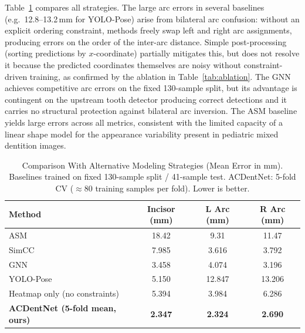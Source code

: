 \documentclass[conference]{IEEEtran}
\begin{document}
Table~\ref{tab:method_comparison} compares all strategies. The large arc errors in several
baselines (e.g.\ 12.8--13.2\,mm for YOLO-Pose) arise from bilateral arc confusion: without an
explicit ordering constraint, methods freely swap left and right arc assignments, producing
errors on the order of the inter-arc distance. Simple post-processing (sorting predictions by
$x$-coordinate) partially mitigates this, but does not resolve it because the predicted
coordinates themselves are noisy without constraint-driven training, as confirmed by the
ablation in Table~\ref{tab:ablation}. The GNN achieves competitive arc errors on the fixed
130-sample split, but its advantage is contingent on the upstream tooth detector producing
correct detections and it carries no structural protection against bilateral arc inversion. The
ASM baseline yields large errors across all metrics, consistent with the limited capacity of a
linear shape model for the appearance variability present in pediatric mixed dentition images.

\begin{table}[htbp]
\caption{Comparison With Alternative Modeling Strategies (Mean Error in mm). Baselines trained
on fixed 130-sample split / 41-sample test. ACDentNet: 5-fold CV (${\approx}80$ training
samples per fold). Lower is better.}
\begin{center}
\begin{tabular}{|l|c|c|c|}
\hline
\textbf{Method} & \textbf{Incisor (mm)} & \textbf{L Arc (mm)} & \textbf{R Arc (mm)} \\
\hline
ASM \cite{cootes1995asm}               & 18.42  &  9.31  & 11.47  \\
SimCC \cite{li2022simcc}               &  7.985 &  3.616 &  3.792 \\
GNN \cite{brody2022gatv2}              &  3.458 &  4.074 &  3.196 \\
YOLO-Pose \cite{maji2022yolo}          &  5.150 & 12.847 & 13.206 \\
Heatmap only (no constraints)          &  5.394 &  3.984 &  6.286 \\
\textbf{ACDentNet (5-fold mean, ours)} & \textbf{2.347} & \textbf{2.324} & \textbf{2.690} \\
\hline
\end{tabular}
\label{tab:method_comparison}
\end{center}
\end{table}
\end{document}
